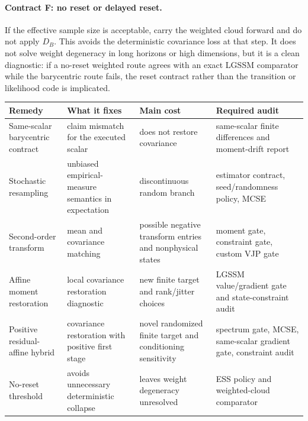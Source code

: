 \paragraph{Contract F: no reset or delayed reset.}
If the effective sample size is acceptable, carry the weighted cloud forward and
do not apply \(D_B\).  This avoids the deterministic covariance loss at that step.
It does not solve weight degeneracy in long horizons or high dimensions, but it is
a clean diagnostic: if a no-reset weighted route agrees with an exact LGSSM
comparator while the barycentric route fails, the reset contract rather than the
transition or likelihood code is implicated.

\begin{center}
\scriptsize
\setlength{\tabcolsep}{3pt}
\begin{tabular}{@{}p{} p{} p{} p{}@{}}
\toprule
Remedy & What it fixes & Main cost & Required audit \\
\midrule
Same-scalar barycentric contract & claim mismatch for the executed scalar & does not restore covariance & same-scalar finite differences and moment-drift report \\
Stochastic resampling & unbiased empirical-measure semantics in expectation & discontinuous random branch & estimator contract, seed/randomness policy, MCSE \\
Second-order transform & mean and covariance matching & possible negative transform entries and nonphysical states & moment gate, constraint gate, custom VJP gate \\
Affine moment restoration & local covariance restoration diagnostic & new finite target and rank/jitter choices & LGSSM value/gradient gate and state-constraint audit \\
Positive residual-affine hybrid & covariance restoration with positive first stage & novel randomized finite target and conditioning sensitivity & spectrum gate, MCSE, same-scalar gradient gate, constraint audit \\
No-reset threshold & avoids unnecessary deterministic collapse & leaves weight degeneracy unresolved & ESS policy and weighted-cloud comparator \\
\bottomrule
\end{tabular}
\setlength{\tabcolsep}{6pt}
\normalsize
\end{center}

